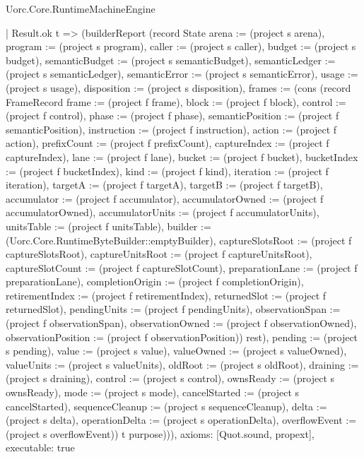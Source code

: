 \begin{lexlean}{Uorc.Core.RuntimeMachineEngine}
\begin{semanticmodule}
{      | Result.ok t => (builderReport (record State {arena := (project s arena), program := (project s program), caller := (project s caller), budget := (project s budget), semanticBudget := (project s semanticBudget), semanticLedger := (project s semanticLedger), semanticError := (project s semanticError), usage := (project s usage), disposition := (project s disposition), frames := (cons (record FrameRecord {frame := (project f frame), block := (project f block), control := (project f control), phase := (project f phase), semanticPosition := (project f semanticPosition), instruction := (project f instruction), action := (project f action), prefixCount := (project f prefixCount), captureIndex := (project f captureIndex), lane := (project f lane), bucket := (project f bucket), bucketIndex := (project f bucketIndex), kind := (project f kind), iteration := (project f iteration), targetA := (project f targetA), targetB := (project f targetB), accumulator := (project f accumulator), accumulatorOwned := (project f accumulatorOwned), accumulatorUnits := (project f accumulatorUnits), unitsTable := (project f unitsTable), builder := (Uorc.Core.RuntimeByteBuilder::emptyBuilder), captureSlotsRoot := (project f captureSlotsRoot), captureUnitsRoot := (project f captureUnitsRoot), captureSlotCount := (project f captureSlotCount), preparationLane := (project f preparationLane), completionOrigin := (project f completionOrigin), retirementIndex := (project f retirementIndex), returnedSlot := (project f returnedSlot), pendingUnits := (project f pendingUnits), observationSpan := (project f observationSpan), observationOwned := (project f observationOwned), observationPosition := (project f observationPosition)}) rest), pending := (project s pending), value := (project s value), valueOwned := (project s valueOwned), valueUnits := (project s valueUnits), oldRoot := (project s oldRoot), draining := (project s draining), control := (project s control), ownsReady := (project s ownsReady), mode := (project s mode), cancelStarted := (project s cancelStarted), sequenceCleanup := (project s sequenceCleanup), delta := (project s delta), operationDelta := (project s operationDelta), overflowEvent := (project s overflowEvent)}) t purpose))),
  axioms: [Quot.sound, propext],
  executable: true
}


\end{semanticmodule}
\end{lexlean}
